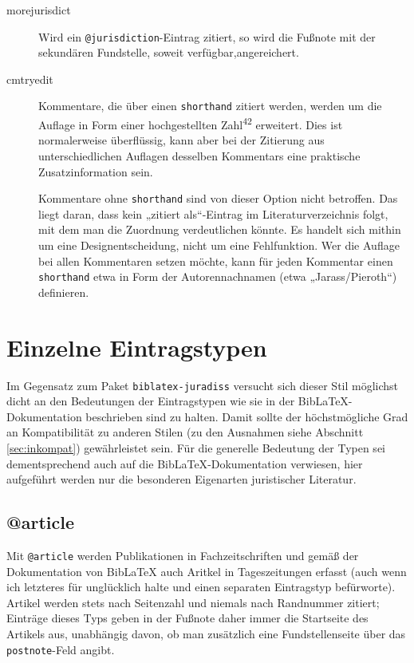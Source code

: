 \documentclass[11pt,a4paper,DIV=calc]{scrartcl}
\newcommand\software[1]{\textsf{#1}}
\newcommand\Biblatex{\software{Bib\LaTeX{}}\xspace}
\begin{document}
\begin{description}
\item[morejurisdict] Wird ein \verb+@jurisdiction+-Eintrag zitiert, so
  wird die Fußnote mit der sekundären Fundstelle, soweit
  verfügbar,angereichert.
\item[cmtryedit] Kommentare, die über einen \verb+shorthand+ zitiert
  werden, werden um die Auflage in Form einer hochgestellten
  Zahl\textsuperscript{42} erweitert. Dies ist normalerweise
  überflüssig, kann aber bei der Zitierung aus unterschiedlichen
  Auflagen desselben Kommentars eine praktische Zusatzinformation
  sein.

  Kommentare ohne \verb+shorthand+ sind von dieser Option nicht
  betroffen. Das liegt daran, dass kein „zitiert als“-Eintrag im
  Literaturverzeichnis folgt, mit dem man die Zuordnung verdeutlichen
  könnte. Es handelt sich mithin um eine Designentscheidung, nicht um
  eine Fehlfunktion. Wer die Auflage bei allen Kommentaren setzen
  möchte, kann für jeden Kommentar einen \verb+shorthand+ etwa in Form
  der Autorennachnamen (etwa „Jarass/Pieroth“) definieren.
\end{description}

\section{Einzelne Eintragstypen}\label{sec:eintragstypen}

Im Gegensatz zum Paket \verb+biblatex-juradiss+ versucht sich dieser
Stil möglichst dicht an den Bedeutungen der Eintragstypen wie sie in
der \Biblatex-Do\-ku\-men\-ta\-tion beschrieben sind zu halten. Damit sollte
der höchstmögliche Grad an Kompatibilität zu anderen Stilen (zu den
Ausnahmen siehe Abschnitt \ref{sec:inkompat}) gewährleistet sein. Für
die generelle Bedeutung der Typen sei dementsprechend auch auf die
\Biblatex-Do\-ku\-men\-ta\-tion verwiesen, hier aufgeführt werden nur die
besonderen Eigenarten juristischer Literatur.

\subsection{@article}

Mit \verb+@article+ werden Publikationen in Fachzeitschriften und
gemäß der Do\-ku\-men\-ta\-tion von \Biblatex auch Aritkel in
Tageszeitungen erfasst (auch wenn ich letzteres für unglücklich halte
und einen separaten Eintragstyp befürworte). Artikel werden stets nach
Seitenzahl und niemals nach Randnummer zitiert; Einträge dieses Typs
geben in der Fußnote daher immer die Startseite des Artikels aus,
unabhängig davon, ob man zusätzlich eine Fundstellenseite über das
\verb+postnote+-Feld angibt.
\end{document}
